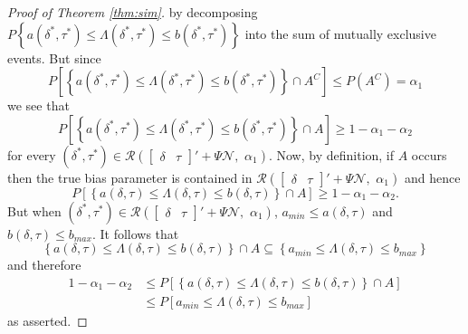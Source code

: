 \begin{proof}[Proof of Theorem \ref{thm:sim}]
by decomposing $P\left\{ a(\delta^{*}, \tau^{*}) \leq \Lambda(\delta^{*}, \tau^{*}) \leq b(\delta^{*}, \tau^{*})  \right\}$ into the sum of mutually exclusive events. But since 
\[
P\left[\left\{ a(\delta^{*}, \tau^{*}) \leq \Lambda(\delta^{*}, \tau^{*}) \leq b(\delta^{*}, \tau^{*})  \right\} \cap A^C \right] \leq P(A^C) = \alpha_1
\]
we see that
\[
P\left[\left\{ a(\delta^{*}, \tau^{*}) \leq \Lambda(\delta^{*}, \tau^{*}) \leq b(\delta^{*}, \tau^{*})  \right\} \cap A \right] \geq 1- \alpha_1 - \alpha_2
\]
for every $ (\delta^{*}, \tau^{*}) \in  \mathscr{R} \left( \begin{bmatrix}
\delta & \tau
\end{bmatrix}' + \Psi \mathscr{N}, \,\, \alpha_1 \right)$. Now, by definition, if $A$ occurs then the true bias parameter is contained in $ \mathscr{R} \left( \begin{bmatrix}
\delta & \tau
\end{bmatrix}' + \Psi \mathscr{N}, \,\, \alpha_1 \right)$ and hence 
\[
P\left[\left\{ a(\delta, \tau) \leq \Lambda(\delta, \tau) \leq b(\delta, \tau)  \right\} \cap A \right] \geq 1- \alpha_1 - \alpha_2.
\]
But when $ (\delta^{*}, \tau^{*}) \in  \mathscr{R} \left( \begin{bmatrix}
\delta & \tau
\end{bmatrix}' + \Psi \mathscr{N}, \,\, \alpha_1 \right)$, $a_{min} \leq a(\delta, \tau)$ and $b(\delta, \tau) \leq b_{max}$. It follows that 
\[
\left \{ a(\delta, \tau) \leq \Lambda (\delta, \tau) \leq b(\delta, \tau) \right \} \cap A \subseteq \left\{ a_{min} \leq \Lambda (\delta, \tau) \leq b_{max}\right \}
\]
and therefore
\begin{align*}
1-\alpha_1 - \alpha_2 &\leq P\left[\left \{ a(\delta, \tau) \leq \Lambda (\delta, \tau) \leq b(\delta, \tau) \right \} \cap A  \right]\\
&\leq P\left[ a_{min} \leq \Lambda(\delta, \tau) \leq b_{max} \right]
\end{align*}
as asserted.
\end{proof}
